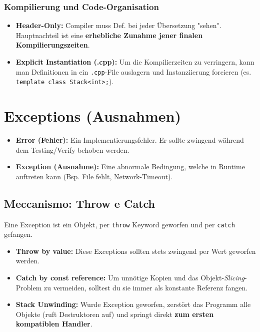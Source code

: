 \subsubsection{Kompilierung und Code-Organisation}
\begin{itemize}
    \item \textbf{Header-Only:} Compiler muss Def. bei jeder Übersetzung "sehen". Hauptnachteil ist eine \textbf{erhebliche Zunahme jener finalen Kompilierungszeiten}.
    \item \textbf{Explicit Instantiation (.cpp):} Um die Kompilierzeiten zu verringern, kann man Definitionen in ein \verb|.cpp|-File auslagern und Instanziierung forcieren (es. \lstinline|template class Stack<int>;|).
\end{itemize}

\section{Exceptions (Ausnahmen)}
\begin{itemize}
    \item \textbf{Error (Fehler):} Ein Implementierungsfehler. Er sollte zwingend während dem Testing/Verify behoben werden.
    \item \textbf{Exception (Ausnahme):} Eine abnormale Bedingung, welche in Runtime auftreten kann (Bsp. File fehlt, Network-Timeout).
\end{itemize}


\subsection{Meccanismo: Throw e Catch}
Eine Exception ist ein Objekt, per \texttt{throw} Keyword geworfen und per \texttt{catch} gefangen.
\begin{itemize}
    \item \textbf{Throw by value:} Diese Exceptions sollten stets zwingend per Wert geworfen werden.
    \item \textbf{Catch by const reference:} Um unnötige Kopien und das Objekt-\textit{Slicing}-Problem zu vermeiden, solltest du sie immer als konstante Referenz fangen.
    \item \textbf{Stack Unwinding:} Wurde Exception geworfen, zerstört das Programm alle Objekte (ruft Destruktoren auf) und springt direkt \textbf{zum ersten kompatiblen Handler}.
\end{itemize}

\vspace{-1em}

